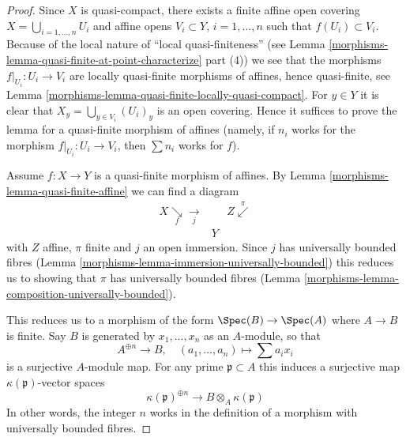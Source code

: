 \begin{proof}

Since $X$ is quasi-compact, there exists a finite affine open covering
$X = \bigcup_{i = 1, \ldots, n} U_i$ and affine opens $V_i \subset Y$,
$i = 1, \ldots, n$ such that $f(U_i) \subset V_i$.
Because of the local nature of ``local quasi-finiteness''
(see Lemma \ref{morphisms-lemma-quasi-finite-at-point-characterize} part (4))
we see that the morphisms $f|_{U_i} : U_i \to V_i$ are locally
quasi-finite morphisms of affines, hence quasi-finite, see
Lemma \ref{morphisms-lemma-quasi-finite-locally-quasi-compact}.
For $y \in Y$ it is clear that $X_y = \bigcup_{y \in V_i} (U_i)_y$
is an open covering. Hence it suffices to prove the lemma
for a quasi-finite morphism of affines (namely, if $n_i$ works
for the morphism $f|_{U_i} : U_i \to V_i$, then $\sum n_i$
works for $f$).

\medskip\noindent
Assume $f : X \to Y$ is a quasi-finite morphism of affines.
By Lemma \ref{morphisms-lemma-quasi-finite-affine}
we can find a diagram
$$
\begin{array}{ccc}X \underset{f}{\searrow}\underset{j}{\longrightarrow} &  & Z \overset{\pi}{\swarrow} \\  & Y & \end{array}
$$
with $Z$ affine, $\pi$ finite and $j$ an open immersion. Since
$j$ has universally bounded fibres
(Lemma \ref{morphisms-lemma-immersion-universally-bounded})
this reduces us to showing that $\pi$ has universally bounded
fibres (Lemma \ref{morphisms-lemma-composition-universally-bounded}).

\medskip\noindent
This reduces us to a morphism of the form $\Spec(B) \to \Spec(A)$ where
$A \to B$ is finite. Say $B$ is generated by $x_1, \ldots, x_n$
as an $A$-module, so that
$$
A^{\oplus n} \longrightarrow B, \quad
(a_1, \ldots, a_n) \longmapsto \sum a_i x_i
$$
is a surjective $A$-module map. For any prime $\mathfrak p \subset A$
this induces a surjective map $\kappa(\mathfrak p)$-vector spaces
$$
\kappa(\mathfrak p)^{\oplus n} \longrightarrow B \otimes_A \kappa(\mathfrak p)
$$
In other words, the integer $n$ works in the definition
of a morphism with universally bounded fibres.
\end{proof}

